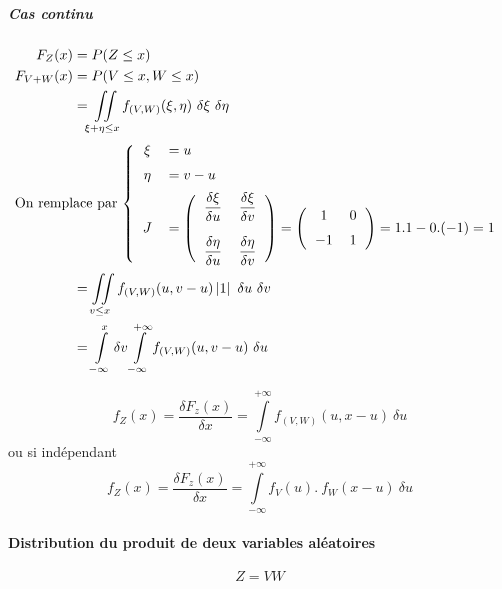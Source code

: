 \subparagraph{Cas continu}
\begin{align*}
	F_Z(x)     &= P(Z \leq x)\\
	F_{V+W}(x) &= P(V \leq x, W \leq x) \\
	           &= \iint\limits_{\xi + \eta\leq x} f_{(V,W)}(\xi,\eta)\ \delta\xi\ \delta\eta\\
\intertext{On remplace par $\left\{
\begin{tabular}{cl}
	$\xi$  & $= u$\\[0.2cm]
	$\eta$ & $= v-u$\\[0.2cm]
	$J$    & $= \left(\begin{tabular}{cc}$\dfrac{\delta\xi}{\delta u}$&$\dfrac{\delta \xi}{\delta v}$\\[0.5cm]$\dfrac{\delta\eta}{\delta u}$&$\dfrac{\delta\eta}{\delta v}$\end{tabular}\right) = \left(\begin{tabular}{cc}1&0\\[0.2cm]$-1$&$1$\end{tabular}\right) = 1.1-0.(-1) = 1$
\end{tabular}
\right.$}
	&= \iint\limits_{v\leq x} f_{(V,W)}(u,v-u)\left|1\right|\ \delta u\ \delta v\\
	&= \int\limits_{-\infty}^x\delta v \int\limits_{-\infty}^{+\infty} f_{(V,W)}(u,v-u)\ \delta u
\end{align*}

$$\boxed{f_Z(x) = \frac{\delta F_z(x)}{\delta x} = \int\limits_{-\infty}^{+\infty} f_{(V,W)}(u,x-u)\ \delta u }$$
ou si indépendant
$$\boxed{f_Z(x) = \frac{\delta F_z(x)}{\delta x} = \int\limits_{-\infty}^{+\infty} f_V\left(u\right).\ f_W\left(x-u\right)\ \delta u }$$


\paragraph{Distribution du produit de deux variables aléatoires}
$$\boxed{Z = VW}$$

